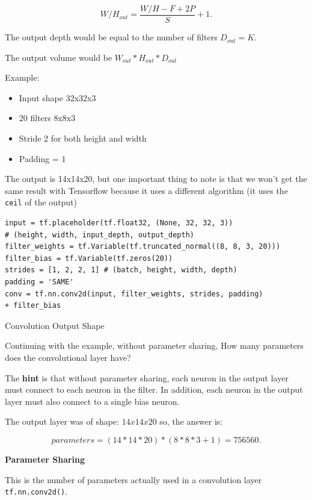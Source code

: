 \documentclass[11pt, a4paper]{article}
\begin{document}
\[
	W/H_{out} =  \frac{W/H-F+2P}{S} + 1
.\] 

The output depth would be equal to the number of filters $D_{out} = K$.

The output volume would be $W_{out} * H_{out} * D_{out}$


Example:


\begin{itemize}
	\item Input shape 32x32x3
	\item 20 filters 8x8x3
	\item Stride 2 for both height and width
	\item Padding = 1
\end{itemize}


The output is 14x14x20, but one important thing to note is that we won't get the same result with Tensorflow because it uses a different algorithm (it uses the \texttt{ceil} of the output)

\begin{listing}
\begin{verbatim}
input = tf.placeholder(tf.float32, (None, 32, 32, 3))
# (height, width, input_depth, output_depth)
filter_weights = tf.Variable(tf.truncated_normal((8, 8, 3, 20))) 
filter_bias = tf.Variable(tf.zeros(20))
strides = [1, 2, 2, 1] # (batch, height, width, depth)
padding = 'SAME'
conv = tf.nn.conv2d(input, filter_weights, strides, padding) 
+ filter_bias
\end{verbatim}
\caption{Convolution Output Shape}
\label{lst:convolution_output_shape}
\end{listing}





Continuing with the example, without parameter sharing, How many parameters does the convolutional layer have?

The \textbf{hint} is that without parameter sharing, each neuron in the output layer must connect to each neuron in the filter. In addition, each neuron in the output layer must also connect to a single bias neuron.


The output layer was of shape: $14x14x20$ so, the answer is:

 \[
	 parameters = (14 * 14 * 20) * (8 * 8 * 3 + 1)  = 756560
.\] 



\textbf{Parameter Sharing}

This is the number of parameters actually used in a convolution layer \texttt{tf.nn.conv2d()}.
\end{document}
